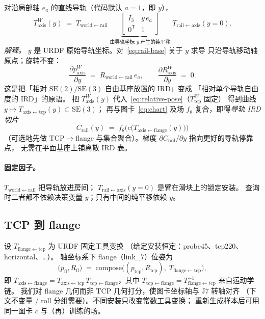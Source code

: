 \documentclass[UTF8,a4paper,11pt,fontset=fandol]{ctexart}
\newcommand{\SE}{\mathrm{SE}}
\newcommand{\Tcp}{T_{\mathrm{tcp}}}
\newcommand{\Taxis}{T_{\mathrm{axis}}}
\begin{document}
对沿局部轴 \(e_{a}\) 的直线导轨（代码默认 \(a=1\)，即 \(y\)），
\begin{equation}
\label{eq:rail-base}
  \Taxis^{W}(y)
  \;=\;
  T_{\mathrm{world\leftarrow rail}}\;
  \underbrace{
    \begin{bmatrix}
      I_{3} & y\, e_{a} \\
      0^{\mathsf T} & 1
    \end{bmatrix}
  }_{\text{由导轨坐标 }y\text{ 产生的纯平移}}\;
  T_{\mathrm{rail\leftarrow axis}}(y{=}0).
\end{equation}
\emph{解释。}
\(y\) 是 URDF 原始导轨坐标。对~\eqref{eq:rail-base} 关于 \(y\) 求导
只沿导轨移动轴原点；旋转不变：
\begin{equation}
\label{eq:rail-jacobian}
  \frac{\partial p_{\mathrm{axis}}^{W}}{\partial y}
  \;=\;
  R_{\mathrm{world\leftarrow rail}}\, e_{a},
  \qquad
  \frac{\partial R_{\mathrm{axis}}^{W}}{\partial y}
  \;=\;
  0.
\end{equation}
这是把「相对 \(\SE(2)/\SE(3)\) 自由基座放置的 IRD」变成
「相对单个导轨自由度的 IRD」的原语。
把 \(\Taxis^{W}(y)\) 代入~\eqref{eq:relative-pose}（\(\Tcp^{W}\) 固定）
得到曲线 \(y\mapsto T_{\mathrm{axis\leftarrow tcp}}(y)\subset\SE(3)\)；
再与图卡~\eqref{eq:chart} 及场 \(f_{\theta}\) 复合，即得\emph{导轨 IRD 切片}
\begin{equation}
\label{eq:rail-ird}
  C_{\mathrm{rail}}(y)
  \;=\;
  f_{\theta}\bigl(
    c\bigl(T_{\mathrm{axis\leftarrow flange}}(y)\bigr)
  \bigr)
\end{equation}
（可选地先做 TCP\(\to\)flange 与集合聚合）。梯度
\(\partial C_{\mathrm{rail}}/\partial y\) 指向更好的导轨停靠点，
无需在平面基座上铺离散 IRD 表。

\paragraph{固定因子。}
\(T_{\mathrm{world\leftarrow rail}}\) 把导轨放进房间；
\(T_{\mathrm{rail\leftarrow axis}}(y{=}0)\) 是臂在滑块上的锁定安装。
查询时二者都不依赖决策变量 \(y\)；只有中间的纯平移依赖 \(y\)。

\subsection{TCP 到 flange}
\label{sec:tcp-flange}

设 \(T_{\mathrm{flange\leftarrow tcp}}\) 为 URDF 固定工具变换
（给定安装恒定：probe45、tcp220、horizontal、\ldots）。
轴坐标系下 flange（link\_7）位姿为
\begin{equation}
\label{eq:tcp-to-flange}
  \bigl(p_{\mathrm{fl}},R_{\mathrm{fl}}\bigr)
  \;=\;
  \mathrm{compose}\bigl(
    (p_{\mathrm{tcp}},R_{\mathrm{tcp}}),\;
    T_{\mathrm{flange\leftarrow tcp}}
  \bigr),
\end{equation}
即 \(T_{\mathrm{axis\leftarrow flange}}
= T_{\mathrm{axis\leftarrow tcp}}\,
T_{\mathrm{tcp\leftarrow flange}}\)，其中
\(T_{\mathrm{tcp\leftarrow flange}}
= T_{\mathrm{flange\leftarrow tcp}}^{-1}\) 来自运动学链。
我们对 flange 几何而非 TCP 几何打分，使图卡坐标轴与 J7 转轴对齐
（下文不变量 / roll 分组需要）。不同安装只改变常数工具变换；
重新生成样本后可用同一图卡 \(c\) 与（再）训练的场。
\end{document}
